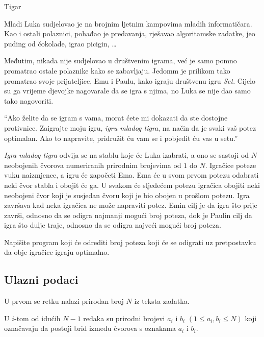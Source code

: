 \begin{statement}[
  problempoints=100,
  timelimit=3 sekunde,
  memorylimit=512 MiB,
]{Tigar}

Mladi Luka sudjelovao je na brojnim ljetnim kampovima mladih informatičara.
Kao i ostali polaznici, pohađao je predavanja, rješavao algoritamske zadatke,
jeo puding od čokolade, igrao picigin, \ldots

Međutim, nikada nije sudjelovao u društvenim igrama, već je samo pomno
promatrao ostale polaznike kako se zabavljaju. Jedomm je prilikom tako
promatrao svoje prijateljice, Emu i Paulu, kako igraju društvenu igru
\textit{Set}. Cijelo su ga vrijeme djevojke nagovarale da se igra s njima,
no Luka se nije dao samo tako nagovoriti.

``Ako želite da se igram s vama, morat ćete mi dokazati da ste dostojne
  protivnice. Zaigrajte moju igru, \textit{igru mladog tigra}, na način da je
  svaki vaš potez optimalan. Ako to napravite, pridružit ću vam se i pobjedit ću
  vas u setu.''

\textit{Igra mladog tigra} odvija se na stablu koje će Luka izabrati, a ono se
sastoji od $N$ neobojenih čvorova numeriranih prirodnim brojevima od $1$ do
$N$. Igračice poteze vuku naizmjence, a igru će započeti Ema. Ema će u svom
prvom potezu odabrati neki čvor stabla i obojit će ga. U svakom će sljedećem
potezu igračica obojiti neki neobojeni čvor koji je susjedan čvoru koji je
bio obojen u prošlom potezu. Igra završava kad neka igračica ne može
napraviti potez. Emin cilj je da igra što prije završi, odnosno da se odigra
najmanji mogući broj poteza, dok je Paulin cilj da igra što dulje traje,
odnosno da se odigra najveći mogući broj poteza.

Napišite program koji će odrediti broj poteza koji će se odigrati uz
pretpostavku da obje igračice igraju optimalno.

\subsection*{Ulazni podaci}

U prvom se retku nalazi prirodan broj $N$ iz teksta zadatka.

U $i$-tom od idućih $N - 1$ redaka su prirodni brojevi $a_i$ i $b_i$
$(1 \le a_i, b_i \le N)$ koji označavaju da postoji brid između čvorova
s oznakama $a_i$ i $b_i$.


\end{statement}

